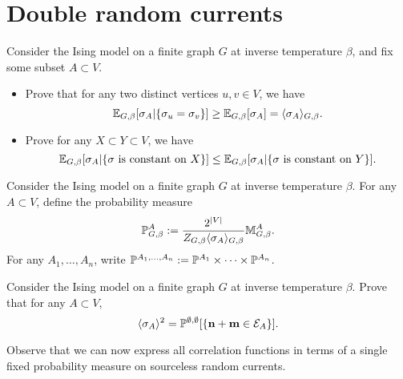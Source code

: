 \section{Double random currents}

\begin{exercise}
    \label{exo:conditioning_equality}
    Consider the Ising model on a finite graph $G$
    at inverse temperature $\beta$, and fix some subset $A\subset V$.
    \begin{itemize}
        \item     Prove that for any two distinct vertices $u,v\in V$,
        we have
        \[
            \E_{G,\beta}[\sigma_A|\{\sigma_u=\sigma_v\}]
            \geq
            \E_{G,\beta}[\sigma_A]=\langle\sigma_A\rangle_{G,\beta}.
        \]
        \item Prove for any $X\subset Y\subset V$, we have
        \[
            \E_{G,\beta}[\sigma_A|\{\text{$\sigma$ is constant on $X$}\}]
            \leq
            \E_{G,\beta}[\sigma_A|\{\text{$\sigma$ is constant on $Y$}\}]
            .
        \]
    \end{itemize}
\end{exercise}


\begin{definition}
    Consider the Ising model on a finite graph $G$
    at inverse temperature $\beta$.
    For any $A\subset V$,
    define the probability measure
    \[
        \P^A_{G,\beta}:=\frac{2^{|V|}}{Z_{G,\beta}\langle\sigma_A\rangle_{G,\beta}}\M^A_{G,\beta}.
    \]
    For any $A_1,\ldots,A_n$,
    write $\P^{A_1,\ldots,A_n}:=\P^{A_1}\times\cdots\times\P^{A_n}$.
\end{definition}

\begin{exercise}
    Consider the Ising model on a finite graph $G$
    at inverse temperature $\beta$.
    Prove that for any $A\subset V$,
    \[
        \langle\sigma_A\rangle^2
        =
        \P^{\emptyset,\emptyset}[\{\n+\m\in\calE_A\}].
    \]

    Observe that we can now express all correlation functions in terms of a single
    fixed probability measure on sourceless random currents.
\end{exercise}

